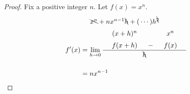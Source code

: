 \documentclass[17pt, handout]{beamer}
\theoremstyle{remark}
\begin{document}
\newcommand\mystack[3]{\overset{\mathclap{\substack{\textstyle #3 \\[1.5ex] \textstyle #2 \vphantom) \\[1.5ex]}}}{\quad\,\,#1\quad\,\,}}
\begin{frame}
\begin{proof}
Fix a positive integer $n$.
Let $f(x) = x^n$.
\begin{align*}
	f'(x) &= \lim_{h\to0} 
	\frac{
		\mystack{f(x+h)}{(x+h)^n}{
			\bcancel{x^n}
			+ nx^{n-1}\bcancel h
			+ (\,\cdots)h^{\bcancel2}
			}
		- \mystack{f(x)}{x^n}{}
		}{\bcancel h}
	\\[1.5em] &= nx^{n-1} \qedhere
	\end{align*}
\end{proof}
\end{frame}
\end{document}
